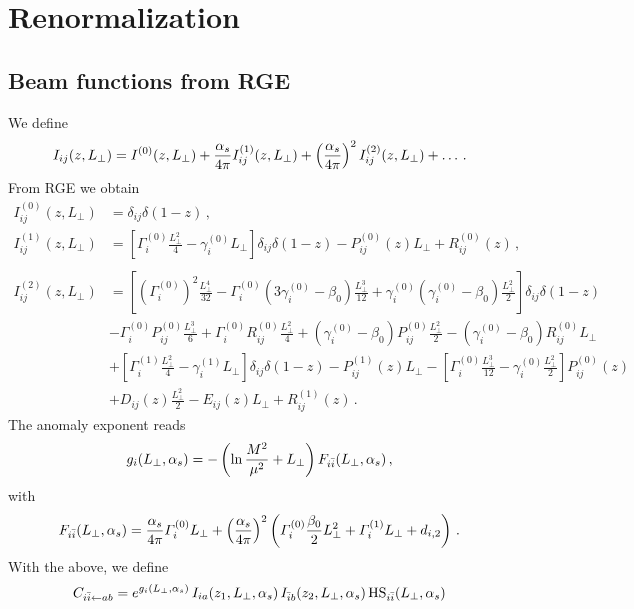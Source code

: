 \documentclass[a4paper,11pt]{report}
\numberwithin{equation}{section}
\newcommand{\Lp}{L_\perp}
\begin{document}
\chapter{Renormalization}

\section{Beam functions from RGE}

We define
%
\begin{equation}
  I_{ij}(z,\Lp) = I^{(0)}(z,\Lp) +
  \asp I^{(1)}_{ij}(z,\Lp) + \left(\asp\right)^2 I^{(2)}_{ij}(z,\Lp) + \ldots\,.
\end{equation}
%
From RGE we obtain
%
\begin{subequations}
  \begin{align}
  I^{(0)}_{ij}(z,\Lp) & = 
  \delta_{ij} \delta(1-z)\,,\\
  I^{(1)}_{ij}(z,\Lp) & = 
  \left[\Gamma^{(0)}_i \frac{\Lp^2}{4} - \gamma^{(0)}_i \Lp \right]
  \delta_{ij} \delta(1-z) - P^{(0)}_{ij} (z) \Lp + R^{(0)}_{ij}(z)\,, \\
  \\
  I^{(2)}_{ij}(z,\Lp) & = 
  \left[
  \left(\Gamma^{(0)}_i\right)^2 \frac{\Lp^4}{32}
  -\Gamma^{(0)}_i\left(3\gamma^{(0)}_i 
  - \beta_0 \right) \frac{\Lp^3}{12}
  + \gamma^{(0)}_i\left(\gamma^{(0)}_i - \beta_0 \right)\frac{\Lp^2}{2}
  \right] \delta_{ij} \delta(1-z) 
  \nonumber \\
  & 
  -\Gamma^{(0)}_i P^{(0)}_{ij} \frac{\Lp^3}{6} 
  +\Gamma^{(0)}_i R^{(0)}_{ij} \frac{\Lp^2}{4} 
  +\left(\gamma^{(0)}_i -\beta_0\right) P^{(0)}_{ij} \frac{\Lp^2}{2} 
  -\left(\gamma^{(0)}_i -\beta_0\right) R^{(0)}_{ij} \Lp
  \nonumber \\
  & 
  + \left[
  \Gamma^{(1)}_i \frac{\Lp^2}{4}-\gamma^{(1)}_i \Lp
  \right] \delta_{ij} \delta(1-z)
  - P^{(1)}_{ij}(z)\Lp
  -\left[
  \Gamma^{(0)}_i \frac{\Lp^3}{12}-\gamma^{(0)}_i \frac{\Lp^2}{2}
  \right] P^{(0)}_{ij}(z) 
  \nonumber \\
  &
  + D_{ij}(z)\frac{\Lp^2}{2} - E_{ij}(z) \Lp + R^{(1)}_{ij}(z)\,.
  \end{align}
\end{subequations}
%
The anomaly exponent reads
\begin{equation}
  g_i (\Lp,\as) =  
  - \left(\ln \frac{M^2}{\mu^2} + \Lp\right) F_{i\bar i}(\Lp,\as)\,,
\end{equation}
%
with
%
\begin{equation}
  F_{i\bar i}(\Lp,\as) = 
  \asp \Gamma^{(0)}_i \Lp + 
  \left(\asp\right)^2 
  \left( \Gamma^{(0)}_i \frac{\beta_0}{2}\Lp^2 +\Gamma^{(1)}_i \Lp + d_{i,2}
  \right)\,.
\end{equation}
%
With the above, we define
%
\begin{equation}
  C_{i\bar i \gets a b} = 
  e^{g_i (\Lp, \as)}\, I_{ia}(z_1,\Lp, \as)\, I_{\bar i b}(z_2,\Lp, \as) \,
  {\rm HS}_{\iibar}(\Lp, \as)
\end{equation}
\end{document}
